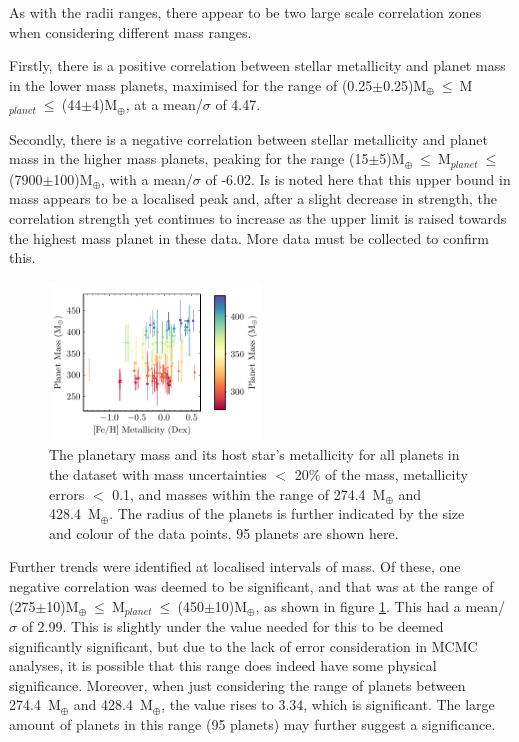\documentclass[a4paper,twocolumn,12pt]{article}
\begin{document}
As with the radii ranges, there appear to be two large scale correlation zones when considering different mass ranges.

Firstly, there is a positive correlation between stellar metallicity and planet mass in the lower mass planets, maximised for the range of (0.25$\pm$0.25)M$_{\oplus}~\leq~$M$_{planet}~\leq~$(44$\pm$4)M$_{\oplus}$, at a mean/$\sigma$ of 4.47.

Secondly, there is a negative correlation between stellar metallicity and planet mass in the higher mass planets, peaking for the range (15$\pm$5)M$_{\oplus}~\leq~$M$_{planet}~\leq~$(7900$\pm$100)M$_{\oplus}$, with a mean/$\sigma$ of -6.02. Is is noted here that this upper bound in mass appears to be a localised peak and, after a slight decrease in strength, the correlation strength yet continues to increase as the upper limit is raised towards the highest mass planet in these data. More data must be collected to confirm this.

\begin{figure}[h!]
    \centering
    \includegraphics[width=0.5\textwidth]{Graphs/FeH vs Mass Planet Plot 274.4 to 428.4.pdf}
    \caption{The planetary mass and its host star's metallicity for all planets in the dataset with mass uncertainties $<$ 20\% of the mass, metallicity errors $<$ 0.1, and masses within the range of 274.4~M$_{\oplus}$ and 428.4~M$_{\oplus}$. The radius of the planets is further indicated by the size and colour of the data points. 95 planets are shown here.}
    \label{figure: Fe/H vs Mass for the jupiter mass range}
\end{figure}

Further trends were identified at localised intervals of mass. Of these, one negative correlation was deemed to be significant, and that was at the range of (275$\pm$10)M$_{\oplus}~\leq~$M$_{planet}~\leq~$(450$\pm$10)M$_{\oplus}$, as shown in figure \ref{figure: Fe/H vs Mass for the jupiter mass range}. This had a mean/$\sigma$ of 2.99. This is slightly under the value needed for this to be deemed significantly significant, but due to the lack of error consideration in MCMC analyses, it is possible that this range does indeed have some physical significance. Moreover, when just considering the range of planets between 274.4~M$_{\oplus}$ and 428.4~M$_{\oplus}$, the value rises to 3.34, which is significant. The large amount of planets in this range (95 planets) may further suggest a significance.
\end{document}
